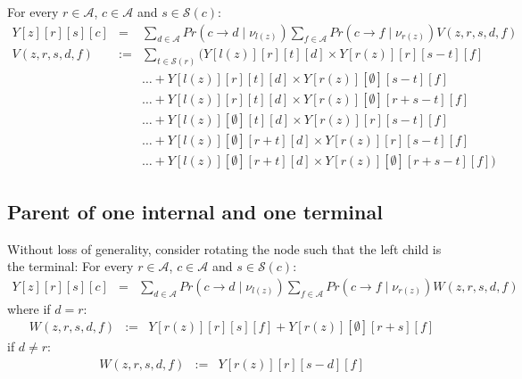 \documentclass[11pt]{article}
\begin{document}
For every $r\in \mathcal{A}$, $c\in \mathcal{A}$ and $s\in\mathcal{S}(c)$:
\begin{eqnarray*}
Y[z][r][s][c] & = & \sum_{d\in \mathcal{A}}Pr(c\rightarrow d\mid \nu_{l(z)})\sum_{f\in \mathcal{A}}Pr(c\rightarrow f\mid \nu_{r(z)}) V(z, r, s, d, f) \\
V(z, r, s, d, f) & := &\sum_{t\in \mathcal{S}(r)}\Bigg(Y[l(z)][r][t][d] \times Y[r(z)][r][s - t][f]
\\ 
& & \ldots + Y[l(z)][r][t][d] \times Y[r(z)][\emptyset][s - t][f] \\
& & \ldots + Y[l(z)][r][t][d] \times Y[r(z)][\emptyset][r + s - t][f]\\
& & \ldots + Y[l(z)][\emptyset][t][d] \times Y[r(z)][r][s - t][f] \\
& & \ldots + Y[l(z)][\emptyset][r + t][d] \times Y[r(z)][r][s - t][f]\\
& & \ldots + Y[l(z)][\emptyset][r + t][d] \times Y[r(z)][\emptyset][r + s - t][f] \Bigg)
\end{eqnarray*}


\subsection{Parent of one internal and one terminal}
Without loss of generality, consider rotating the node such that 
the left child is the terminal:
For every $r\in \mathcal{A}$, $c\in \mathcal{A}$ and $s\in\mathcal{S}(c)$:
\begin{eqnarray*}
Y[z][r][s][c] & = & \sum_{d\in \mathcal{A}}Pr(c\rightarrow d\mid \nu_{l(z)})\sum_{f\in \mathcal{A}}Pr(c\rightarrow f\mid \nu_{r(z)}) W(z, r, s, d, f)
\end{eqnarray*}
where if $d = r$:
\begin{eqnarray*}
W(z, r, s, d, f) & := & Y[r(z)][r][s][f] + Y[r(z)][\emptyset][r + s][f]
\end{eqnarray*}
if $d \neq r$:
\begin{eqnarray*}
W(z, r, s, d, f) & := &Y[r(z)][r][s - d][f]
\end{eqnarray*}


\end{document}
